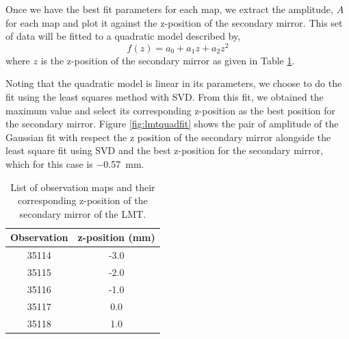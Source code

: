Once we have the best fit parameters for each map, we extract the amplitude, $A$ for each map and plot it against the z-position of the secondary mirror. This set of data will be fitted to a quadratic model described by,
\begin{equation}
    f(z)=a_0+a_1z+a_2z^2
\end{equation}
where $z$ is the z-position of the secondary mirror as given in Table \ref{tab:LMTmaps}. 

Noting that the quadratic model is linear in its parameters, we choose to do the fit using the least squares method with SVD. From this fit, we obtained the maximum value and select its corresponding z-position as the best position for the secondary mirror. Figure \ref{fig:lmtquadfit} shows the pair of amplitude of the Gaussian fit with respect the z position of the secondary mirror alongside the least square fit using SVD and the best z-position for the secondary mirror, which for this case is \SI{-0.57}{\milli\m}.




\begin{table}[h]
    \centering
    \begin{tabular}{|c|c|}
        \toprule
         Observation  & z-position (mm)  \\
         \midrule
         35114 & -3.0\\
         35115 & -2.0 \\
         35116 & -1.0 \\
         35117 & 0.0 \\
         35118 & 1.0\\
         \bottomrule
    \end{tabular}
    \caption{List of observation maps and their corresponding z-position of the secondary mirror of the LMT.}
    \label{tab:LMTmaps}
\end{table}

